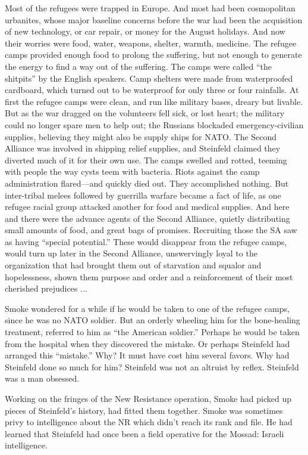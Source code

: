 Most of the refugees were trapped in Europe. And most had been cosmopolitan urbanites, whose major baseline concerns before the war had been the acquisition of new technology, or car repair, or money for the August holidays. And now their worries were food, water, weapons, shelter, warmth, medicine. The refugee camps provided enough food to prolong the suffering, but not enough to generate the energy to find a way out of the suffering. The camps were called ``the shitpits'' by the English speakers. Camp shelters were made from waterproofed cardboard, which turned out to be waterproof for only three or four rainfalls. At first the refugee camps were clean, and run like military bases, dreary but livable. But as the war dragged on the volunteers fell sick, or lost heart; the military could no longer spare men to help out; the Russians blockaded emergency-civilian supplies, believing they might also be supply ships for NATO. The Second Alliance was involved in shipping relief supplies, and Steinfeld claimed they diverted much of it for their own use. The camps swelled and rotted, teeming with people the way cysts teem with bacteria. Riots against the camp administration flared—and quickly died out. They accomplished nothing. But inter-tribal melees followed by guerrilla warfare became a fact of life, as one refugee racial group attacked another for food and medical supplies. And here and there were the advance agents of the Second Alliance, quietly distributing small amounts of food, and great bags of promises. Recruiting those the SA saw as having ``special potential.'' These would disappear from the refugee camps, would turn up later in the Second Alliance, unswervingly loyal to the organization that had brought them out of starvation and squalor and hopelessness, shown them purpose and order and a reinforcement of their most cherished prejudices ...

Smoke wondered for a while if he would be taken to one of the refugee camps, since he was no NATO soldier. But an orderly wheeling him for the bone-healing treatment, referred to him as ``the American soldier.'' Perhaps he would be taken from the hospital when they discovered the mistake. Or perhaps Steinfeld had arranged this ``mistake.'' Why? It must have cost him several favors. Why had Steinfeld done so much for him? Steinfeld was not an altruist by reflex. Steinfeld was a man obsessed.

Working on the fringes of the New Resistance operation, Smoke had picked up pieces of Steinfeld's history, had fitted them together. Smoke was sometimes privy to intelligence about the NR which didn't reach its rank and file. He had learned that Steinfeld had once been a field operative for the Mossad: Israeli intelligence.

